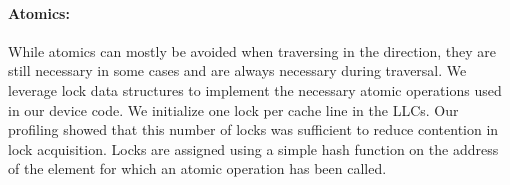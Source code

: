 \paragraph{Atomics:}
While atomics can mostly be avoided when traversing in the \pull direction, they are still necessary in some cases and are always necessary during \push traversal.
We leverage lock data structures to implement the necessary atomic operations used in our device code.
We initialize one lock per cache line in the LLCs.
Our profiling showed that this number of locks was sufficient to reduce contention in lock acquisition.
Locks are assigned using a simple hash function on the address of the element for which an atomic operation has been called.



